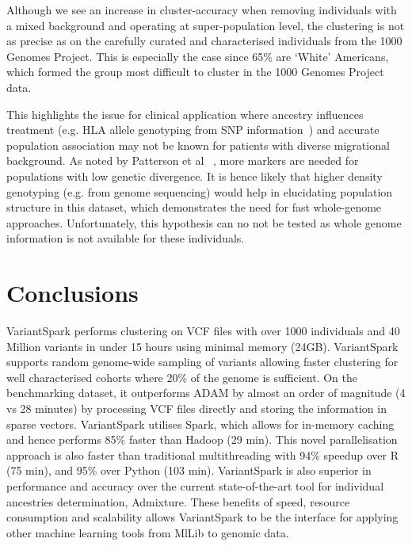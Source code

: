 \documentclass{bmcart}
\newcommand{\variantSpark}{{\sc VariantSpark}}
\begin{document}
Although we see an increase in cluster-accuracy when removing individuals with a mixed background and operating at super-population level, the clustering is not as precise as on the carefully curated and characterised individuals from the 1000 Genomes Project.
This is especially the case since 65\% are `White' Americans, which formed the group most difficult to cluster in the 1000 Genomes Project data.

This highlights the issue for clinical application where ancestry influences treatment (e.g. HLA allele genotyping from SNP information~\cite{Zheng2014}) and accurate population association may not be known for patients with diverse migrational background.
As noted by Patterson et al ~\cite{Patterson2006}, more markers are needed for populations with low genetic divergence. 
It is hence likely that higher density genotyping (e.g. from genome sequencing) would help in elucidating population structure in this dataset, which demonstrates the need for fast whole-genome approaches. 
Unfortunately, this hypothesis can no not be tested as whole genome information is not available for these individuals. 




\section*{Conclusions}

\variantSpark{} performs clustering on VCF files with over 1000 individuals and 40 Million variants in under 15 hours using minimal memory (24GB). 
\variantSpark{} supports random genome-wide sampling of variants allowing faster clustering for well characterised cohorts where 20\% of the genome is sufficient. 
On the benchmarking dataset, it outperforms {\sc ADAM} by almost an order of magnitude (4 vs 28 minutes) by processing VCF files directly and storing the information in sparse vectors. %
\variantSpark{} utilises {\sc Spark}, which allows for in-memory caching and hence performs 85\% faster than Hadoop (29 min).
This novel parallelisation approach is also faster than traditional multithreading with 94\% speedup over R (75 min), and 95\% over Python (103 min).
\variantSpark{} is also superior in performance and accuracy over the current state-of-the-art tool for individual ancestries determination, {\sc Admixture}.
These benefits of speed, resource consumption and scalability allows \variantSpark{} to be the interface for applying other machine learning tools from MlLib to genomic data. 
\end{document}
